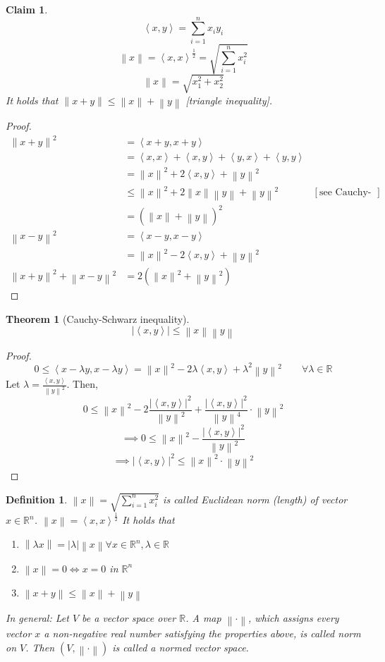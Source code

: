 \documentclass{article}
\newtheorem{theorem}{Theorem}  \numberwithin{theorem}{section}
\newtheorem{definition}{Definition}  \numberwithin{definition}{section}
\newtheorem*{claim}{Claim}%
\newcommand{\angel}[1]{\left\langle#1\right\rangle}
\newcommand{\norm}[1]{\left\|#1\right\|}
\newcommand{\card}[1]{\left|#1\right|}
\begin{document}
\begin{claim}
  \[ \angel{x, y} = \sum_{i=1}^n x_i y_i \]
  \[ \norm{x} = \angel{x,x}^{\frac12} = \sqrt{\sum_{i=1}^n x_i^2} \]
  \[ \norm{x} = \sqrt{x_1^2 + x_2^2} \]
  It holds that $\norm{x+y} \leq \norm{x} + \norm{y}$ [triangle inequality].
\end{claim}

\begin{proof}
  \begin{align*}
    \norm{x + y}^2
      &= \angel{x+y, x+y} \\
      &= \angel{x,x} + \angel{x,y} + \angel{y,x} + \angel{y,y} \\
      &= \norm{x}^2 + 2\angel{x,y} + \norm{y}^2 \\
      &\leq \norm{x}^2 + 2 \norm{x} \norm{y} + \norm{y}^2  & [\text{see Cauchy-Schwarz inequality}] \\
      &= (\norm{x} + \norm{y})^2 \\
    \norm{x - y}^2
      &= \angel{x - y, x - y} \\
      &= \norm{x}^2 - 2\angel{x,y} + \norm{y}^2 \\
    \norm{x + y}^2 + \norm{x - y}^2
      &= 2 \left(\norm{x}^2 + \norm{y}^2\right)
  \end{align*}
\end{proof}

\begin{theorem}[Cauchy-Schwarz inequality]
  \[ \card{\angel{x, y}} \leq \norm{x} \norm{y} \]
\end{theorem}
\begin{proof}
  \[ 0 \leq \angel{x - \lambda y, x - \lambda y} = \norm{x}^2 - 2\lambda \angel{x, y} + \lambda^2 \norm{y}^2 \qquad \forall \lambda \in \mathbb R \]
  Let $\lambda = \frac{\angel{x, y}}{\norm{y}^2}$. Then,
  \[ 0 \leq \norm{x}^2 - 2 \frac{\card{\angel{x, y}}^2}{\norm{y}^2} + \frac{\card{\angel{x, y}}^2}{\norm{y}^4} \cdot \norm{y}^2 \]
  \[ \implies 0 \leq \norm{x}^2 - \frac{\card{\angel{x, y}}^2}{\norm{y}^2} \]
  \[ \implies \card{\angel{x, y}}^2 \leq \norm{x}^2 \cdot \norm{y}^2 \]
\end{proof}

\begin{definition}
  $\norm{x} = \sqrt{\sum_{i=1}^n x_i^2}$ is called \emph{Euclidean norm} (length) of vector $x \in \mathbb R^n$. $\norm{x} = \angel{x, x}^{\frac12}$
  It holds that
  \begin{enumerate}
    \item $\norm{\lambda x} = \card{\lambda} \norm{x} \forall x \in \mathbb R^n, \lambda \in \mathbb R$
    \item $\norm{x} = 0 \iff x = 0$ in $\mathbb R^n$
    \item $\norm{x + y} \leq \norm{x} + \norm{y}$
  \end{enumerate}

  In general: Let $V$ be a vector space over $\mathbb R$. A map $\norm\cdot$, which assigns every vector $x$ a non-negative real number satisfying the properties above,
  is called \emph{norm on $V$}. Then $(V, \norm\cdot)$ is called a \emph{normed vector space}.
\end{definition}
\end{document}
